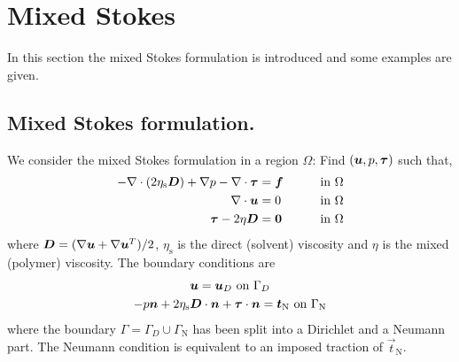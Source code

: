 
\def\headdate{12th November 2021}

\section{Mixed Stokes}
\label{sec:mixedstokes}

In this section the mixed Stokes formulation is introduced and some examples
are given.

\subsection{Mixed Stokes formulation.}

We consider the mixed Stokes formulation in a region $\Omega$:
Find $(\boldsymbol{u},p,\boldsymbol{\tau})$ such that,
\begin{alignat*}{2}
      -\nabla\cdot(2\eta_\text{s}\boldsymbol{D})+\nabla p-\nabla\cdot\boldsymbol{\tau}
        &=\boldsymbol{f}\qquad&&\text{in }\Omega\\
\nabla\cdot\boldsymbol{u}&=0\qquad&&\text{in }\Omega\\
 \boldsymbol{\tau}-2\eta\boldsymbol{D}&=\boldsymbol{0}\qquad&&\text{in }\Omega
\end{alignat*}
where $\boldsymbol{D}=(\nabla\boldsymbol{u}+\nabla\boldsymbol{u}^T)/2$, $\eta_\text{s}$ is the direct (solvent) viscosity
and $\eta$ is the mixed (polymer) viscosity. The boundary conditions are
\begin{gather*}
    \boldsymbol{u} = \boldsymbol{u}_D\text{ on }\Gamma_D\\
    -p\boldsymbol{n}+2\eta_\text{s} \boldsymbol{D}\cdot\boldsymbol{n}+\boldsymbol{\tau}\cdot\boldsymbol{n}=\boldsymbol{t}_{\text{N}}
\text{ on }\Gamma_{\text{N}}
\end{gather*}
where the boundary $\Gamma=\Gamma_D\cup\Gamma_{\text{N}}$ has been split into a
Dirichlet and a Neumann part. The Neumann condition is equivalent
to an imposed traction of $\vec t_{\text{N}}$.

